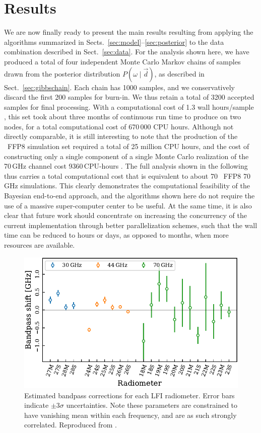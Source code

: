 \documentclass[onecolumn]{aa}
\renewcommand{\d}[0]{\vec{d}}
\begin{document}
\section{Results}
\label{sec:results}


We are now finally ready to present the main results resulting from
applying the algorithms summarized in
Sects.~\ref{sec:model}--\ref{sec:posterior} to the data combination
described in Sect.~\ref{sec:data}. For the analysis shown here, we
have produced a total of four independent Monte Carlo Markov chains of
samples drawn from the posterior distribution $P(\omega\mid\d)$, as
described in Sect.~\ref{sec:gibbschain}. Each chain has 1000 samples,
and we conservatively discard the first 200 samples for burn-in. We
thus retain a total of 3200 accepted samples for final
processing. With a computational cost of 1.3 wall hours/sample
\citep{bp03}, this set took about three months of continuous run time
to produce on two nodes, for a total computational cost of 670\,000
CPU hours. Although not directly comparable, it is still interesting
to note that the production of the \Planck\ FFP8 simulation set
required a total of 25 million CPU hours, and the cost of constructing
only a single component of a single Monte Carlo realization of the
70\,GHz channel cost 9360\,CPU-hours \citep{planck2014-a14}. The full
analysis shown in the following thus carries a total computational
cost that is equivalent to about 70 \Planck\ FFP8 70\,GHz
simulations. This clearly demonstrates the computational feasibility
of the Bayesian end-to-end approach, and the algorithms shown here do
not require the use of a massive super-computer center to be
useful. At the same time, it is also clear that future work should
concentrate on increasing the concurrency of the current
implementation through better parallelization schemes, such that the
wall time can be reduced to hours or days, as opposed to months, when
more resources are available.

\begin{figure}[t]
  \center
  \includegraphics[width=0.5\linewidth]{figs/bpshifts_BP10tune.pdf}
  \caption{Estimated bandpass corrections for each LFI radiometer. Error bars indicate $\pm3\sigma$ uncertainties. Note these parameters are constrained to have vanishing mean within each frequency, and are as such strongly correlated. Reproduced from \citet{bp09}. }\label{fig:bpshift}
\end{figure}
\end{document}
